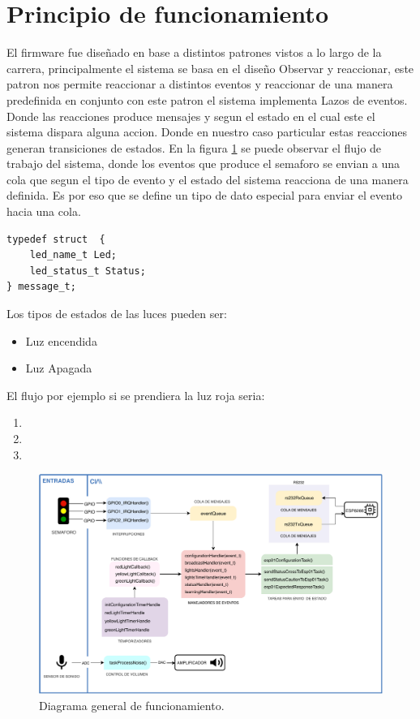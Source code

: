 \section{Principio de funcionamiento}
El firmware fue diseñado en base a distintos patrones vistos a lo largo de la carrera, principalmente el sistema se basa en el diseño Observar y reaccionar, este patron nos permite reaccionar a distintos eventos y reaccionar de una manera predefinida en conjunto con este patron el sistema implementa Lazos de eventos. Donde las reacciones produce mensajes y segun el estado en el cual este el sistema dispara alguna accion. Donde en nuestro caso particular estas reacciones generan transiciones de estados.
En la figura \ref{fig:generalWorkFlow} se puede observar el flujo de trabajo del sistema, donde los eventos que produce el semaforo se envian a una cola que segun el tipo de evento y el estado del sistema reacciona de una manera definida.
Es por eso que se define un tipo de dato especial para enviar el evento hacia una cola.

\lstset{language=C, breaklines=true, basicstyle=\footnotesize}
\begin{lstlisting}
typedef struct  {
	led_name_t Led;
	led_status_t Status;
} message_t;
\end{lstlisting}

Los tipos de estados de las luces pueden ser:

\begin{itemize}
\item Luz encendida
\item Luz Apagada
\end{itemize}

El flujo por ejemplo si se prendiera la luz roja seria:
\begin{enumerate}
\item
\item
\item
\end{enumerate}
\begin{figure}[h]
	\centering
	\includegraphics[scale=.6]{./Figures/generalWorkFlow.pdf}
	\caption{Diagrama general de funcionamiento.}
	\label{fig:generalWorkFlow}
\end{figure}
